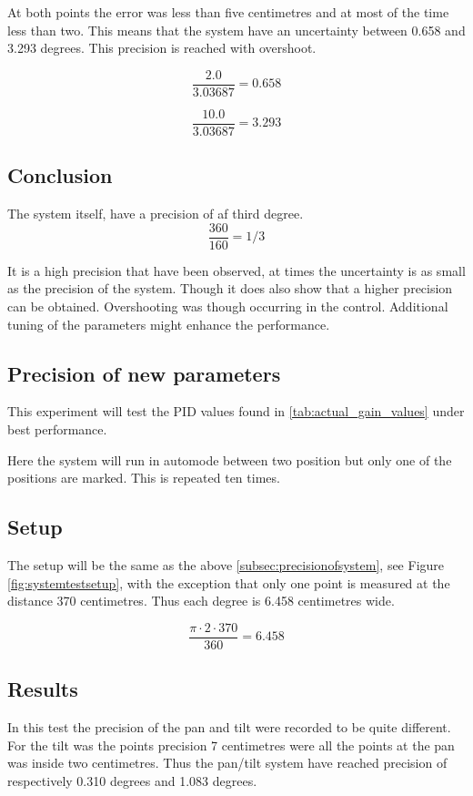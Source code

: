 At both points the error was less than five centimetres and at most of the time
less than two. This means that the system have an uncertainty between 0.658 and
3.293 degrees. This precision is reached with overshoot.

\[ \frac{2.0}{3.03687} = 0.658 \]

\[ \frac{10.0}{3.03687} = 3.293 \]

\subsection*{Conclusion}

The system itself, have a precision of af third degree.
\[ \frac{360}{160} = 1/3 \]

It is a high precision that have been observed, at times the uncertainty is as
small as the precision of the system. Though it does also show that a higher
precision can be obtained. Overshooting was though occurring in the control.
Additional tuning of the parameters might enhance the performance.

\subsection{Precision of new parameters}\label{sec:precisionofsystem2}

This experiment will test the PID values found in \ref{tab:actual_gain_values}
under best performance.

Here the system will run in automode between two position but only one of the
positions are marked. This is repeated ten times.

\subsection*{Setup}

The setup will be the same as the above \ref{subsec:precisionofsystem}, see
Figure \ref{fig:systemtestsetup}, with the exception that only one point is measured at
the distance 370 centimetres. Thus each degree is 6.458 centimetres wide.

\[ \frac{\pi \cdot 2 \cdot 370}{360} = 6.458 \]

\subsection*{Results}

In this test the precision of the pan and tilt were recorded to be quite
different. For the tilt was the points precision 7 centimetres were all the
points at the pan was inside two centimetres. Thus the pan/tilt system have
reached precision of respectively 0.310 degrees and 1.083 degrees.


